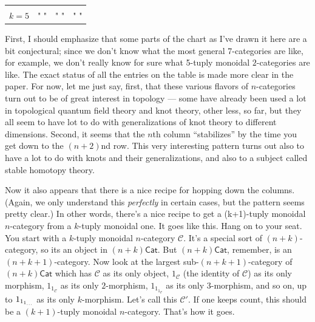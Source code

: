 \documentclass[12pt]{article}
\begin{document}
\begin{longtable}[]{@{}llll@{}}
\begin{minipage}[t]{0.21\columnwidth}
\strut
\end{minipage}\tabularnewline
\begin{minipage}[t]{0.26\columnwidth}\raggedright
\(k=5\)\strut
\end{minipage} & \begin{minipage}[t]{0.21\columnwidth}\raggedright
" "\strut
\end{minipage} & \begin{minipage}[t]{0.21\columnwidth}\raggedright
" "\strut
\end{minipage} & \begin{minipage}[t]{0.21\columnwidth}\raggedright
" "\strut
\end{minipage}\tabularnewline
\bottomrule
\end{longtable}

First, I should emphasize that some parts of the chart as I've drawn it
here are a bit conjectural; since we don't know what the most general
7-categories are like, for example, we don't really know for sure what
5-tuply monoidal \(2\)-categories are like. The exact status of all the
entries on the table is made more clear in the paper. For now, let me
just say, first, that these various flavors of \(n\)-categories turn out
to be of great interest in topology --- some have already been used a
lot in topological quantum field theory and knot theory, other less, so
far, but they all seem to have lot to do with generalizations of knot
theory to different dimensions. Second, it seems that the \(n\)th column
``stabilizes'' by the time you get down to the \((n+2)\)nd row. This
very interesting pattern turns out also to have a lot to do with knots
and their generalizations, and also to a subject called stable homotopy
theory.

Now it also appears that there is a nice recipe for hopping down the
columns. (Again, we only understand this \emph{perfectly} in certain
cases, but the pattern seems pretty clear.) In other words, there's a
nice recipe to get a (k+1)-tuply monoidal \(n\)-category from a
\(k\)-tuply monoidal one. It goes like this. Hang on to your seat. You
start with a \(k\)-tuply monoidal \(n\)-category \(\mathcal{C}\). It's a
special sort of \((n+k)\)-category, so its an object in
\((n+k)\mathsf{Cat}\). But \((n+k)\mathsf{Cat}\), remember, is an
\((n+k+1)\)-category. Now look at the largest sub-\((n+k+1)\)-category
of \((n+k)\mathsf{Cat}\) which has \(\mathcal{C}\) as its only object,
\(1_{\mathcal{C}}\) (the identity of \(\mathcal{C}\)) as its only
morphism, \(1_{1_{\mathcal{C}}}\) as its only \(2\)-morphism,
\(1_{1_{1_{\mathcal{C}}}}\) as its only \(3\)-morphism, and so on, up to
\(1_{1_{1_{\scriptsize\ldots}}}\) as its only \(k\)-morphism. Let's call
this \(\mathcal{C}'\). If one keeps count, this should be a
\((k+1)\)-tuply monoidal \(n\)-category. That's how it goes.
\end{document}
